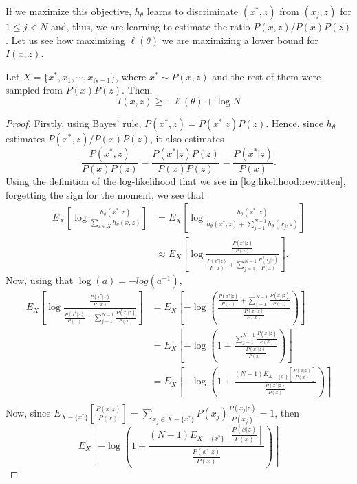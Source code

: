 If we maximize this objective, $h_\theta$ learns to discriminate $(x^*,z)$ from $(x_j,z)$ for $ 1 \leq j < N$ and, thus, we are learning to estimate the ratio $P(x,z)/P(x)P(z)$. Let us see how maximizing $\ell(\theta)$ we are maximizing a lower bound for $I(x,z)$.

\begin{nprop}\label{Prop:Bound:NCE}
Let $X = \{x^*, x_1,\cdots,x_{N-1} \}$, where $x^* \sim P(x,z)$ and the rest of them were sampled from $P(x)P(z)$. Then,
\begin{equation}\label{Bound:NCE}
I(x,z) \geq -  \ell(\theta) + \log N
\end{equation}
\end{nprop}
\begin{proof}

Firstly, using Bayes' rule, $P(x^*,z) = P(x^*|z)P(z)$. Hence, since $h_\theta$ estimates $P(x^*,z)/P(x)P(z)$, it also estimates
\[
\frac{P(x^*,z)}{P(x)P(z)} = \frac{P(x^*|z)P(z)}{P(x)P(z)} = \frac{P(x^*|z)}{P(x)}.
\]
Using the definition of the log-likelihood that we see in \eqref{log:likelihood:rewritten}, forgetting the sign for the moment, we see that
\begin{align*}
E_X \left[ \log \frac{h_\theta(x^*,z)}{\sum_{x \in X}h_\theta(x,z)}\right] & =  E_X \left[ \log \frac{h_\theta(x^*,z)}{ h_\theta(x^*,z) + \sum_{j = 1}^{N-1} h_\theta(x_j,z)}\right] \\
& \approx E_X \left[ \log \frac{\frac{P(x^*|z)}{P(x)}}{ \frac{P(x^*|z)}{P(x)} + \sum_{j = 1}^{N-1} \frac{P(x_j|z)}{P(x)}}\right].
\end{align*}
Now, using that $\log(a) = -log(a^{-1})$,
\begin{align*}
E_X \left[ \log \frac{\frac{P(x^*|z)}{P(x)}}{ \frac{P(x^*|z)}{P(x)} + \sum_{j = 1}^{N-1} \frac{P(x_j|z)}{P(x)}}\right] & = E_X\left[ -\log\left( \frac{\frac{P(x^*|z)}{P(x)} + \sum_{j = 1}^{N-1} \frac{P(x_j|z)}{P(x)}}{\frac{P(x^*|z)}{P(x)}}\right) \right] \\
& = E_X\left[ -\log\left( 1+ \frac{ \sum_{j = 1}^{N-1} \frac{P(x_j|z)}{P(x)}}{\frac{P(x^*|z)}{P(x)}} \right) \right] \\
& = E_X\left[ -\log\left( 1+ \frac{ (N-1) E_{X - \{x^*\}}\left[\frac{P(x|z)}{P(x)}\right] }{\frac{P(x^*|z)}{P(x)}}\right)\right] \\
\end{align*}
Now, since $E_{X - \{x^*\}} \left[ \frac{P(x|z)}{P(x)} \right] = \sum_{x_j \in X - \{x^*\}} P(x_j) \frac{P(x_j|z)}{P(x_j)} = 1$, then
\[
E_X\left[ -\log\left( 1+ \frac{ (N-1) E_{X - \{x^*\}}\left[\frac{P(x|z)}{P(x)}\right] }{\frac{P(x^*|z)}{P(x)}}\right)\right]  
\]
\end{proof}
